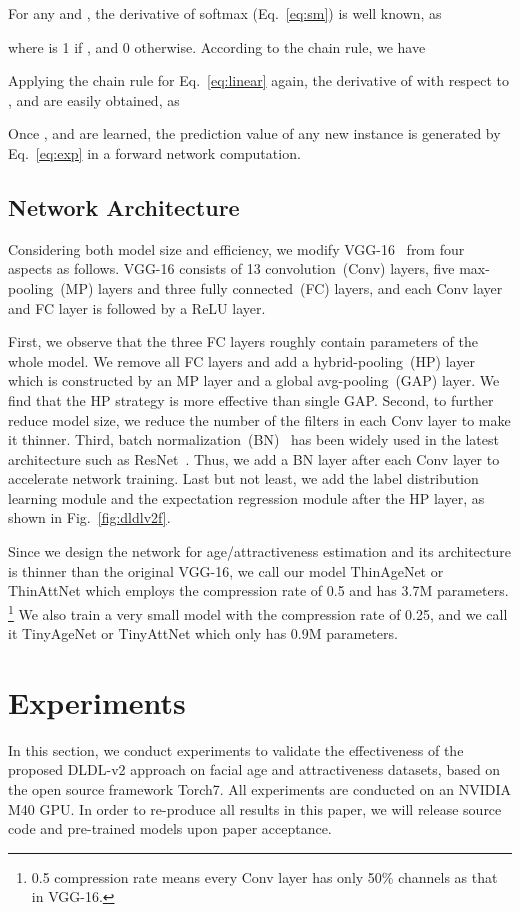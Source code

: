 \documentclass[5p,times,twocolumn]{elsarticle}
\begin{document}
For any  and , the derivative of softmax (Eq.~\eqref{eq:sm}) is well known, as

where  is 1 if , and 0 otherwise. According to the chain rule, we have


Applying the chain rule for Eq.~\eqref{eq:linear} again, the derivative of  with respect to ,  and  are easily obtained, as


Once ,  and  are learned, the prediction value  of any new
instance  is generated by Eq.~\eqref{eq:exp} in a forward network computation.

\subsection{Network Architecture}
Considering both model size and efficiency, we modify VGG-16~\cite{simonyan2015very} from four aspects as follows. VGG-16 consists of 13 convolution~(Conv) layers, five max-pooling~(MP) layers and three fully connected~(FC) layers, and each Conv layer and FC layer is followed by a ReLU layer.

First, we observe that the three FC layers roughly contain  parameters of the whole model. We remove all FC layers and add a hybrid-pooling~(HP) layer which is constructed by an MP layer and a global avg-pooling~(GAP) layer. We find that the HP strategy is more effective than single GAP. Second, to further reduce model size, we reduce the number of the filters in each Conv layer to make it thinner. Third, batch normalization~(BN)~\cite{ioffe2015batch} has been widely used in the latest architecture such as ResNet~\cite{he2016deep}. Thus, we add a BN layer after each Conv layer to accelerate network training. Last but not least, we add the label distribution learning module and the expectation regression module after the HP layer, as shown in Fig.~\ref{fig:dldlv2f}.

Since we design the network for age/attractiveness estimation and its architecture is thinner than the original VGG-16, we call our model ThinAgeNet or ThinAttNet which employs the compression rate of 0.5 and has 3.7M parameters. \footnote {0.5 compression rate means every Conv layer has only 50\% channels as that in VGG-16.} 
We also train a very small model with the compression rate of 0.25, and we call it TinyAgeNet or TinyAttNet which only has 0.9M parameters.

\section{Experiments}\label{sec:ex}
In this section, we conduct experiments to validate the effectiveness of the proposed DLDL-v2 approach on facial age and attractiveness datasets, based on the open source framework Torch7. All experiments are conducted on an NVIDIA M40 GPU. In order to re-produce all results in this paper, we will release source code and pre-trained models upon paper acceptance.
\end{document}
